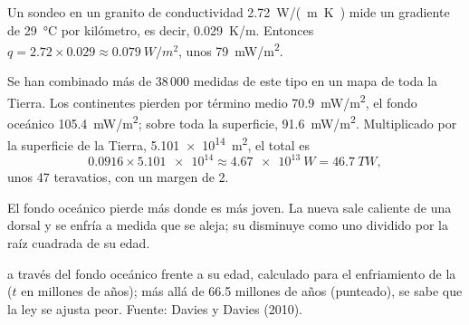 \begin{example}\label{ex:g12:internal-heat:borehole}
Un sondeo en un granito de conductividad \qty{2.72}{W/(m.K)} mide un
gradiente de \qty{29}{\celsius} por kilómetro, es decir, \qty{0.029}{K/m}.
Entonces $q = 2.72 \times 0.029 \approx \qty{0.079}{W/m^2}$, unos
\qty{79}{mW/m^2}.
\end{example}

Se han combinado más de 38\,000 medidas de este tipo en un mapa de toda la
Tierra. Los continentes pierden por término medio \qty{70.9}{mW/m^2}, el fondo
oceánico \qty{105.4}{mW/m^2}; sobre toda la superficie, \qty{91.6}{mW/m^2}.
Multiplicado por la superficie de la Tierra, \qty{5.101e14}{m^2}, el total es
\[
  0.0916 \times \num{5.101e14} \approx \qty{4.67e13}{W} = \qty{46.7}{TW},
\]
unos 47 teravatios, con un margen de 2.

El fondo oceánico pierde más donde es más joven. La  nueva sale
caliente de una dorsal y se enfría a medida que se aleja; su 
disminuye como uno dividido por la raíz cuadrada de su edad.

\begin{omfigure}

{\small {} a través del fondo oceánico frente a su edad, calculado
para el enfriamiento de la  ($t$ en millones de años); más allá de
66.5 millones de años (punteado), se sabe que la ley se ajusta peor. Fuente:
Davies y Davies (2010).}
\end{omfigure}

